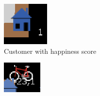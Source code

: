 \begin{center}
\begin{figure}
     \centering
     \begin{subfigure}[m]{0.1\textwidth}
         \centering
         \includegraphics[width=\textwidth]{sections/pics/cust_happy}
         \caption{Customer with happiness score}
     \end{subfigure}
     \hfill
     \begin{subfigure}[m]{0.1\textwidth}
         \centering
         \includegraphics[width=\textwidth]{sections/pics/del_on_its_way}

\end{subfigure}
\end{figure}
\end{center}
